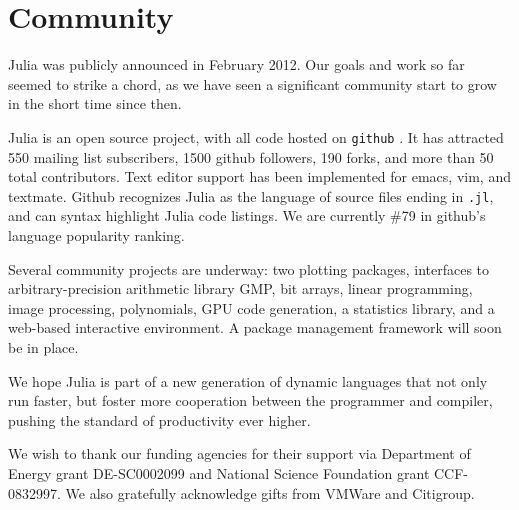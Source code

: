\documentclass[9pt]{sigplanconf}
\begin{document}
\section{Community}

Julia was publicly announced in February 2012. Our goals and work so
far seemed to strike a chord, as we have seen a significant community
start to grow in the short time since then.

Julia is an open source project, with all code hosted on
{\tt github} \cite{github}.
It has attracted 550 mailing list subscribers, 1500 github followers,
190 forks, and more than 50 total contributors. Text editor support
has been implemented for emacs, vim, and textmate.
Github recognizes Julia as the language of source files ending in
{\tt .jl}, and can syntax highlight Julia code listings.
We are currently \#79 in github's language popularity ranking.

Several community projects are underway: two plotting packages,
interfaces to arbitrary-precision arithmetic library GMP,
bit arrays, linear programming, image processing, polynomials,
GPU code generation, a statistics library, and a web-based interactive
environment. A package management framework will soon be in place.

We hope Julia is part of a new generation of dynamic languages that not
only run faster, but foster more cooperation between the programmer
and compiler, pushing the standard of productivity ever higher.






\acks 
We wish to thank our funding agencies for their support via
Department of Energy grant DE-SC0002099 and National Science Foundation
grant CCF-0832997. We also gratefully acknowledge gifts from
VMWare and Citigroup.




%
\end{document}
